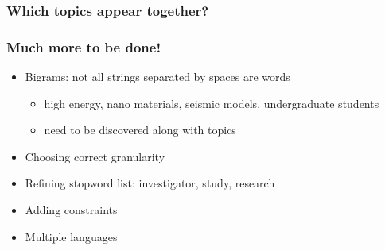 \begin{frame}
  \frametitle{Which topics appear together?}
  \centering
\end{frame}

\begin{frame}
  \frametitle{Much more to be done!}

  \begin{itemize}
    \item Bigrams: not all strings separated by spaces are words
      \begin{itemize}
        \item high energy, nano materials, seismic models, undergraduate students
          \item need to be discovered along with topics
        \end{itemize}
        \item Choosing correct granularity
        \item Refining stopword list: investigator, study, research
        \item \alert<2>{Adding constraints}
        \item \alert<2>{Multiple languages}
   \end{itemize}

\end{frame}
